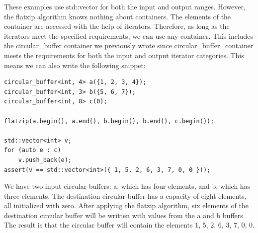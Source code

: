 These examples use std::vector for both the input and output ranges. However, the flatzip algorithm knows nothing about containers. The elements of the container are accessed with the help of iterators. Therefore, as long as the iterators meet the specified requirements, we can use any container. This includes the circular\_buffer container we previously wrote since circular\_buffer\_container meets the requirements for both the input and output iterator categories. This means we can also write the following snippet:

\begin{lstlisting}[style=styleCXX]
circular_buffer<int, 4> a({1, 2, 3, 4});
circular_buffer<int, 3> b({5, 6, 7});
circular_buffer<int, 8> c(0);

flatzip(a.begin(), a.end(), b.begin(), b.end(), c.begin());

std::vector<int> v;
for (auto e : c)
	v.push_back(e);
assert(v == std::vector<int>({ 1, 5, 2, 6, 3, 7, 0, 0 }));
\end{lstlisting}

We have two input circular buffers: a, which has four elements, and b, which has three elements. The destination circular buffer has a capacity of eight elements, all initialized with zero. After applying the flatzip algorithm, six elements of the destination circular buffer will be written with values from the a and b buffers. The result is that the circular buffer will contain the elements 1, 5, 2, 6, 3, 7, 0, 0.














